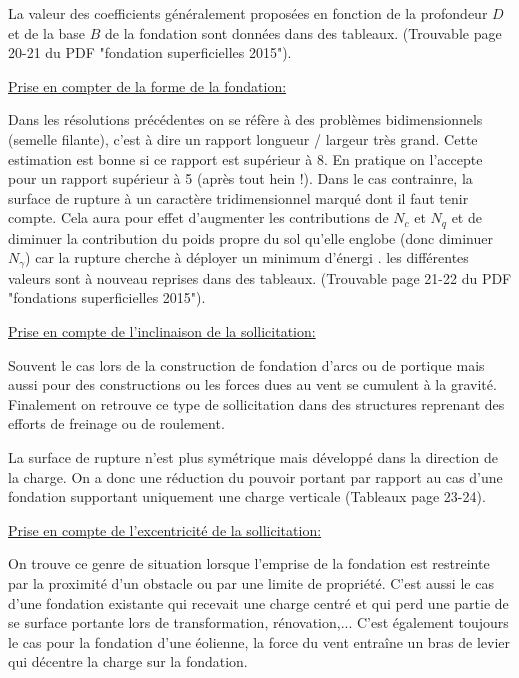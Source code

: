             La valeur des coefficients généralement proposées en fonction de la profondeur $D$ et de la base $B$ de la fondation sont données dans des tableaux. (Trouvable page 20-21 du PDF "fondation superficielles 2015"). 
            
            \underline{Prise en compter de la forme de la fondation:} 
        
            Dans les résolutions précédentes on se réfère à des problèmes bidimensionnels (semelle filante), c'est à dire un rapport longueur / largeur très grand. Cette estimation est bonne si ce rapport est supérieur à 8. En pratique on l'accepte pour un rapport supérieur à 5 (après tout hein !). Dans le cas contrainre, la surface de rupture à un caractère tridimensionnel marqué dont il faut tenir compte. Cela aura pour effet d'augmenter les contributions de $N_c$ et $N_q$ et de diminuer la contribution du poids propre du sol qu'elle englobe (donc diminuer $N_{\gamma}$) car la rupture cherche à déployer un minimum d'énergi . les différentes valeurs sont à nouveau reprises dans des tableaux. (Trouvable page 21-22 du PDF "fondations superficielles 2015"). 
            
            \underline{Prise en compte de l'inclinaison de la sollicitation:} 
            
            Souvent le cas lors de la construction de fondation d'arcs ou de portique mais aussi pour des constructions ou les forces dues au vent se cumulent à la gravité. Finalement on retrouve ce type de sollicitation dans des structures reprenant des efforts de freinage ou de roulement.
            
            La surface de rupture n'est plus symétrique mais développé dans la direction de la charge. On a donc une réduction du pouvoir portant par rapport au cas d'une fondation supportant uniquement une charge verticale (Tableaux page 23-24). 
            
            \underline{Prise en compte de l'excentricité de la sollicitation:} 
            
            On trouve ce genre de situation lorsque l'emprise de la fondation est restreinte par la proximité d'un obstacle ou par une limite de propriété. C'est aussi le cas d'une fondation existante qui recevait une charge centré et qui perd une partie de se surface portante lors de transformation, rénovation,... C'est également toujours le cas pour la fondation d'une éolienne, la force du vent entraîne un bras de levier qui décentre la charge sur la fondation.
            
